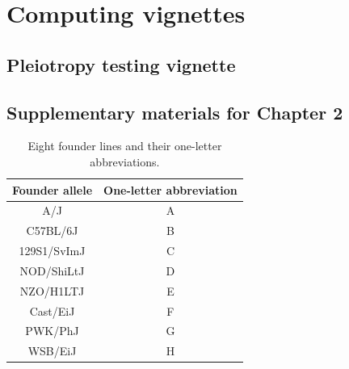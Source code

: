 \documentclass[oneside]{book}\usepackage[]{graphicx}\usepackage[]{color}
\begin{document}

\chapter{Computing vignettes}


\section{Pleiotropy testing vignette}




\printbibliography



\newpage
\begin{appendices}
\appendixpage
\noappendicestocpagenum
\addappheadtotoc

\chapter{Supplementary materials for Chapter 2}

\renewcommand{\thetable}{\textbf{S\arabic{table}}}
\setcounter{table}{0}


\begin{table}
  \caption{Eight founder lines and their one-letter abbreviations.}
  \label{table-letters}
\begin{center}
\small
  \begin{tabular}{ c | c }
    \hline
    Founder allele & One-letter abbreviation \\ \hline
    A/J & A \\
    C57BL/6J & B \\
    129S1/SvImJ & C \\
    NOD/ShiLtJ & D\\
    NZO/H1LTJ & E\\
    Cast/EiJ & F\\
    PWK/PhJ & G\\
    WSB/EiJ & H\\
    \hline
  \end{tabular}

\end{center}
  \end{table}

\clearpage


\end{appendices}
\end{document}
